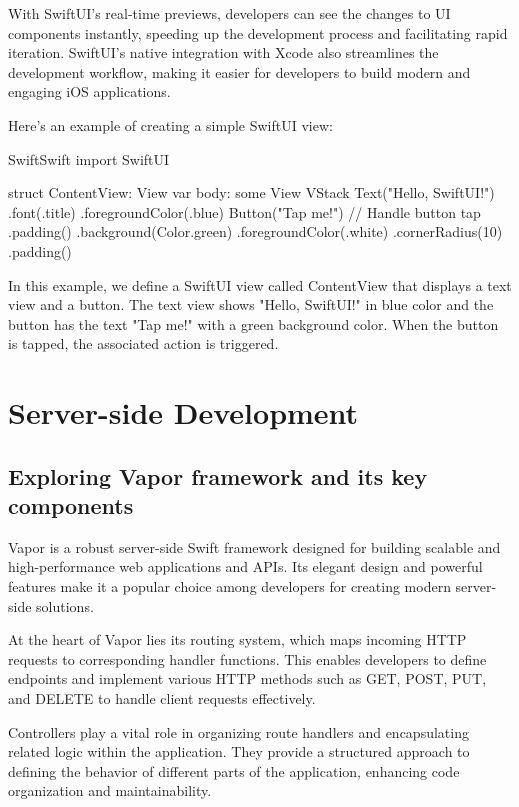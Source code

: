 \documentclass[
  biblatex,
  language=english,
  figures=false,
  sourcecodes,
  glossaries,
  index
]{kidiplom}
\begin{document}
With SwiftUI's real-time previews, developers can see the changes to UI components instantly, speeding up the development process and facilitating rapid iteration. SwiftUI's native integration with Xcode also streamlines the development workflow, making it easier for developers to build modern and engaging iOS applications.

Here's an example of creating a simple SwiftUI view:

\begin{kicode}{Swift}{}{Swift}
import SwiftUI

struct ContentView: View {
    var body: some View {
        VStack {
            Text("Hello, SwiftUI!")
                .font(.title)
                .foregroundColor(.blue)
            Button("Tap me!") {
                // Handle button tap
            }
            .padding()
            .background(Color.green)
            .foregroundColor(.white)
            .cornerRadius(10)
        }
        .padding()
    }
}
\end{kicode}

In this example, we define a SwiftUI view called ContentView that displays a text view and a button. The text view shows "Hello, SwiftUI!" in blue color and the button has the text "Tap me!" with a green background color. When the button is tapped, the associated action is triggered.


\section{Server-side Development}
\subsection{Exploring Vapor framework and its key components}

Vapor is a robust server-side Swift framework designed for building scalable and high-performance web applications and APIs. Its elegant design and powerful features make it a popular choice among developers for creating modern server-side solutions.

At the heart of Vapor lies its routing system, which maps incoming HTTP requests to corresponding handler functions. This enables developers to define endpoints and implement various HTTP methods such as GET, POST, PUT, and DELETE to handle client requests effectively.

Controllers play a vital role in organizing route handlers and encapsulating related logic within the application. They provide a structured approach to defining the behavior of different parts of the application, enhancing code organization and maintainability.
\end{document}
